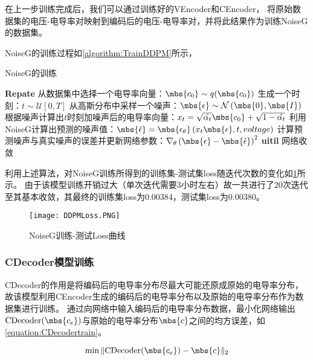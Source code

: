 在上一步训练完成后，我们可以通过训练好的VEncoder和CEncoder，
将原始数据集的电压-电导率对映射到编码后的电压-电导率对，并将此结果作为训练NoiseG的数据集。

NoiseG的训练过程如\cref{algorithm:TrainDDPM}所示，

\begin{algorithm}[H]
    
    \caption{NoiseG的训练}
    \begin{algorithmic}[1]
        \State \textbf{Repate}
        \State 从数据集中选择一个电导率向量：$\mbs{c_0} \sim q(\mbs{c_0})$
        \State 生成一个时刻：$t \sim \mathcal{U}\left[0, T\right]$
        \State 从高斯分布中采样一个噪声：$\mbs{\epsilon} \sim \mathcal{N}\left(\mbs{0}, \mbs{I}\right) $
        \State 根据噪声计算出$t$时刻加噪声后的电导率向量：$x_t = \sqrt{\hat{\alpha_t}}\mbs{c_0} + \sqrt{1-\hat{\alpha_t}}$
        \State 利用NoiseG计算出预测的噪声值：$\mbs{\hat{\epsilon}} = \mbs{\epsilon_{\theta}}\left(x_t\mbs{\epsilon}, t, voltage\right)$
        \State 计算预测噪声与真实噪声的误差并更新网络参数：$\nabla_\theta\left(\mbs{\epsilon} - \mbs{\hat{\epsilon}}\right)^2$
       \State \textbf{uitil} 网络收敛
    \end{algorithmic}
    \label{algorithm:TrainDDPM}
\end{algorithm}

利用上述算法，对NoiseG训练所得到的训练集-测试集loss随迭代次数的变化如\cref{figure:DDPMLoss}所示。
由于该模型训练开销过大（单次迭代需要3小时左右）故一共进行了20次迭代至其基本收敛，其最终的训练集loss为0.00384，测试集loss为0.00380。

\begin{figure}[h]
    \centering
    \texttt{[image: DDPMLoss.PNG]}
    \caption{NoiseG训练-测试Loss曲线}
    \label{figure:DDPMLoss}
\end{figure}

\subsubsection{CDecoder模型训练}

CDecoder的作用是将编码后的电导率分布尽最大可能还原成原始的电导率分布，故该模型利用CEncoder生成的编码后的电导率分布以及原始的电导率分布作为数据集进行训练。
通过向网络中输入编码后的电导率分布数据，最小化网络输出$\text{CDecoder}(\mbs{c_e})$与原始的电导率分布$\mbs{c}$之间的均方误差，如\cref{equation:CDecodertrain}。

\begin{equation}
    \label{equation:CDecodertrain}
    \min \|\text{CDecoder}(\mbs{c_e}) - \mbs{c}\|_2
\end{equation}

